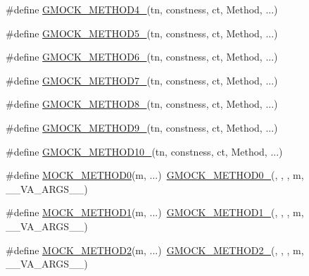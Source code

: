 \begin{DoxyCompactItemize}
\item 
\#define \hyperlink{gmock-generated-function-mockers_8h_ab6430f2cfad9de4aca5258ea559294bb}{G\+M\+O\+C\+K\+\_\+\+M\+E\+T\+H\+O\+D4\+\_\+}(tn,  constness,  ct,  Method, ...)
\item 
\#define \hyperlink{gmock-generated-function-mockers_8h_a9e3ecd392499ab19a4a6d3adcabf56f6}{G\+M\+O\+C\+K\+\_\+\+M\+E\+T\+H\+O\+D5\+\_\+}(tn,  constness,  ct,  Method, ...)
\item 
\#define \hyperlink{gmock-generated-function-mockers_8h_ad0ca7f6973a076d0af4c953f8ed91842}{G\+M\+O\+C\+K\+\_\+\+M\+E\+T\+H\+O\+D6\+\_\+}(tn,  constness,  ct,  Method, ...)
\item 
\#define \hyperlink{gmock-generated-function-mockers_8h_ab98a8399ba62b53b375c2807f4d39d2f}{G\+M\+O\+C\+K\+\_\+\+M\+E\+T\+H\+O\+D7\+\_\+}(tn,  constness,  ct,  Method, ...)
\item 
\#define \hyperlink{gmock-generated-function-mockers_8h_aa84a36427c44505207b7cad5dec7ad67}{G\+M\+O\+C\+K\+\_\+\+M\+E\+T\+H\+O\+D8\+\_\+}(tn,  constness,  ct,  Method, ...)
\item 
\#define \hyperlink{gmock-generated-function-mockers_8h_aa820171a19cc587c247dbe05cbffc55f}{G\+M\+O\+C\+K\+\_\+\+M\+E\+T\+H\+O\+D9\+\_\+}(tn,  constness,  ct,  Method, ...)
\item 
\#define \hyperlink{gmock-generated-function-mockers_8h_a81a48223a8771de36ef92ac6d56f6e81}{G\+M\+O\+C\+K\+\_\+\+M\+E\+T\+H\+O\+D10\+\_\+}(tn,  constness,  ct,  Method, ...)
\item 
\#define \hyperlink{gmock-generated-function-mockers_8h_a411c69e9d489d590480f728d365ae450}{M\+O\+C\+K\+\_\+\+M\+E\+T\+H\+O\+D0}(m, ...)~\hyperlink{gmock-generated-function-mockers_8h_ae0d290ffa58d7c624b2e3487ba1252f4}{G\+M\+O\+C\+K\+\_\+\+M\+E\+T\+H\+O\+D0\+\_\+}(, , , m, \+\_\+\+\_\+\+V\+A\+\_\+\+A\+R\+G\+S\+\_\+\+\_\+)
\item 
\#define \hyperlink{gmock-generated-function-mockers_8h_ac49d366be035ee87b73264a29059cdc7}{M\+O\+C\+K\+\_\+\+M\+E\+T\+H\+O\+D1}(m, ...)~\hyperlink{gmock-generated-function-mockers_8h_a1bc0012d62440dda77208dabdf4925c9}{G\+M\+O\+C\+K\+\_\+\+M\+E\+T\+H\+O\+D1\+\_\+}(, , , m, \+\_\+\+\_\+\+V\+A\+\_\+\+A\+R\+G\+S\+\_\+\+\_\+)
\item 
\#define \hyperlink{gmock-generated-function-mockers_8h_ab3fb7d97f21dc99205db38a14df4a1c4}{M\+O\+C\+K\+\_\+\+M\+E\+T\+H\+O\+D2}(m, ...)~\hyperlink{gmock-generated-function-mockers_8h_a885295ca6bebb15efb3fc786218c5d47}{G\+M\+O\+C\+K\+\_\+\+M\+E\+T\+H\+O\+D2\+\_\+}(, , , m, \+\_\+\+\_\+\+V\+A\+\_\+\+A\+R\+G\+S\+\_\+\+\_\+)

\end{DoxyCompactItemize}
